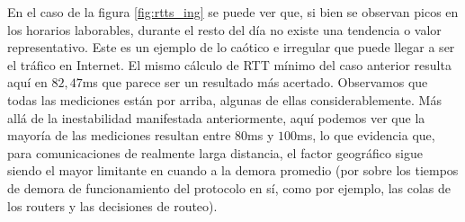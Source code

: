 En el caso de la figura \ref{fig:rtts_ing} se puede ver que, si bien se observan picos en los horarios laborables, durante el resto del día no existe una tendencia o valor representativo. Este es un ejemplo de lo caótico e irregular que puede llegar a ser el tráfico en Internet. El mismo cálculo de RTT mínimo del caso anterior resulta aquí en $82,47$ms que parece ser un resultado más acertado. Observamos que todas las mediciones están por arriba, algunas de ellas considerablemente. Más allá de la inestabilidad manifestada anteriormente, aquí podemos ver que la mayoría de las mediciones resultan entre $80$ms y $100$ms, lo que evidencia que, para comunicaciones de realmente larga distancia, el factor geográfico sigue siendo el mayor limitante en cuando a la demora promedio (por sobre los tiempos de demora de funcionamiento del protocolo en sí, como por ejemplo, las colas de los routers y las decisiones de routeo).